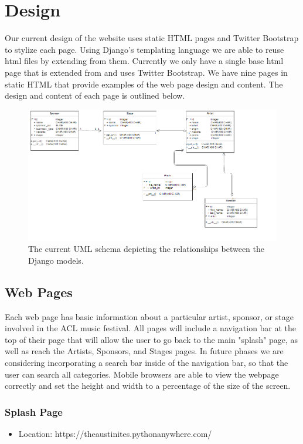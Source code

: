 \documentclass[12pt,english]{scrartcl}
\begin{document}
\section{Design}
Our current design of the website uses static HTML pages and Twitter Bootstrap to stylize each page.
Using Django's templating language we are able to reuse html files by extending from them. Currently we only have a single base html page that is extended from and 
uses Twitter Bootstrap. We have nine pages in static HTML that provide examples of the web page design and content. The design and content of each page is outlined below.
\begin{figure}[h!]
\includegraphics[width=\textwidth]{UML}
 \caption{The current UML schema depicting the relationships between the Django models.}
\end{figure}

\subsection{Web Pages}
Each web page has basic information about a particular artist, sponsor, or stage involved in the ACL music festival.
All pages will include a navigation bar at the top of their page that will allow the user to go back to the main "splash" page, as well as reach the Artists, Sponsors, and
Stages pages. In future phases we are considering incorporating a search bar inside of the navigation bar, so that the user can search
all categories. Mobile browsers are able to view the webpage correctly and set the height and width to a percentage of the size of the screen.

\subsubsection{Splash Page}
\begin{itemize}
 \item Location: https://theaustinites.pythonanywhere.com/
\end{itemize}
\end{document}
